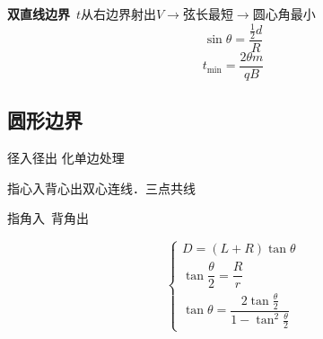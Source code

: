 \textbf{双直线边界}\ $t$\quad 从右边界射出\quad $V$$\to$弦长最短$\to$圆心角最小
\[ \sin\theta=\frac{\frac12 d}{R} \]
\[ t_{\min}=\frac{2\theta m}{qB} \]

\subsection{圆形边界}
径入径出
化单边处理

指心入背心出\quad 双心连线．三点共线\quad {}

指角入\ 背角出


\[
\begin{cases}D=(L+R)\tan\theta\\[4pt] \tan\dfrac{\theta}{2}=\dfrac{R}{r}\\[8pt] \tan\theta=\dfrac{2\tan\frac{\theta}{2}}{1-\tan^{2}\frac{\theta}{2}}\end{cases}
\]


